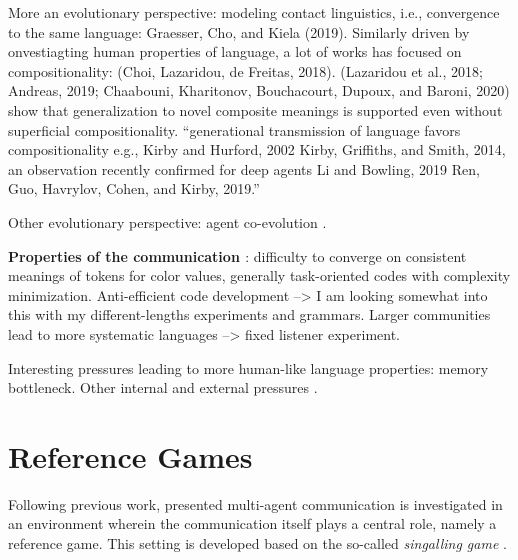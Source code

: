 More an evolutionary perspective: modeling contact linguistics, i.e., convergence to the same language: Graesser, Cho, and Kiela (2019). Similarly driven by onvestiagting human properties of language, a lot of works has focused on compositionality: (Choi, Lazaridou, de Freitas, 2018). (Lazaridou et al., 2018; Andreas, 2019; Chaabouni, Kharitonov, Bouchacourt, Dupoux, and Baroni, 2020) show that generalization to novel composite meanings is supported even without superficial compositionality. 
``generational transmission of language favors compositionality e.g., Kirby and Hurford, 2002 Kirby, Griffiths, and Smith, 2014, an observation recently confirmed for deep agents Li and Bowling, 2019 Ren, Guo, Havrylov, Cohen, and Kirby, 2019.''

Other evolutionary perspective: agent co-evolution \parencite{dagan2020co}.

\textbf{Properties of the communication \parencite{lazaridou2020multi}}: difficulty to converge on consistent meanings of tokens for color values, generally task-oriented codes with complexity minimization. Anti-efficient code development --> I am looking somewhat into this with my different-lengths experiments and grammars.  Larger communities lead to more systematic languages --> fixed listener experiment.

Interesting pressures leading to more human-like language properties: memory bottleneck. Other internal and external pressures \parencite{luna2020internal}. 





\section{Reference Games}

Following previous work, presented multi-agent communication is investigated in an environment wherein the communication itself plays a central role, namely a reference game. This setting is developed based on the so-called \textit{singalling game} \parencite[e.g.,][]{lewis1969convention, skyrms2010signals} . 

